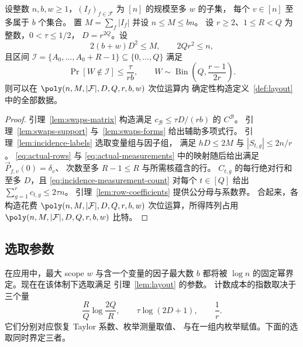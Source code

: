 \begin{lemma}\label{lem:layout}
设整数 $n,b,w\ge1$，$(I_f)_{f\in\mathcal F}$
为 $[n]$ 的规模至多 $w$ 的子集，
每个 $v\in[n]$ 至多属于 $b$ 个集合。
置 $M=\sum_f|I_f|$ 并设 $n\le M\le bn$。
设 $r\ge2$、$1\le R<Q$ 为整数，$0<\tau\le1/2$，
$D=r^{2Q}$。设
\[
 2(b+w)D^2\le M,\qquad 2Qr^2\le n,
\]
且区间
$\mathcal I=\{A_0,\ldots,A_0+R-1\}\subseteq\{0,\ldots,Q\}$
满足
\[
 \Pr[W\notin\mathcal I]\le\frac{\tau}{rb},\qquad
 W\sim\operatorname{Bin}\!\left(Q,\frac{r-1}{2r}\right).
\]
则可以在 $\poly(n,M,|\mathcal F|,D,Q,r,b,w)$ 次位运算内
确定性构造定义~\ref{def:layout} 中的全部数据。
\end{lemma}
\begin{proof}
引理~\ref{lem:swaps-matrix} 构造满足
$c_{\mathcal B}\le\tau D/(rb)$ 的 $C^{\mathcal B}$。
引理~\ref{lem:swaps-support} 与~\ref{lem:swaps-forms}
给出辅助多项式行。
引理~\ref{lem:incidence-labels} 选取变量组与因子组，
满足 $hD\le2M$ 与 $|S_{t,g}|\le2n/r$。
\eqref{eq:actual-rows} 与 \eqref{eq:actual-measurements}
中的映射随后给出满足 $\vec{P}_{f,v}(0)=\delta_v$、
次数至多 $R-1\le R$ 与所需核蕴含的行。
$C_{t,g}$ 的每行绝对行和至多 $D$，且
\eqref{eq:incidence-measurement-count} 对每个 $t\in[Q]$
给出 $\sum_{g=1}^r c_{t,g}\le2\tau n$。
引理~\ref{lem:row-coefficients} 提供公分母与系数界。
合起来，各构造花费 $\poly(n,M,|\mathcal F|,D,Q,r,b,w)$
次位运算，所得阵列占用
$\poly(n,M,|\mathcal F|,D,Q,r,b,w)$ 比特。
\end{proof}

\subsection{选取参数}\label{subsec:incidence-parameters}
在应用中，最大 scope $w$ 与含一个变量的因子最大数 $b$
都将被 $\log n$ 的固定幂界定。现在在该体制下选取满足
引理~\ref{lem:layout} 的参数。
计数成本的指数取决于三个量
\[
 \frac RQ\log\frac{2Q}{R},\qquad
 \tau\log(2D+1),\qquad \frac1r.
\]
它们分别对应恢复 Taylor 系数、枚举测量取值、
与在一组内枚举赋值。下面的选取同时界定三者。

